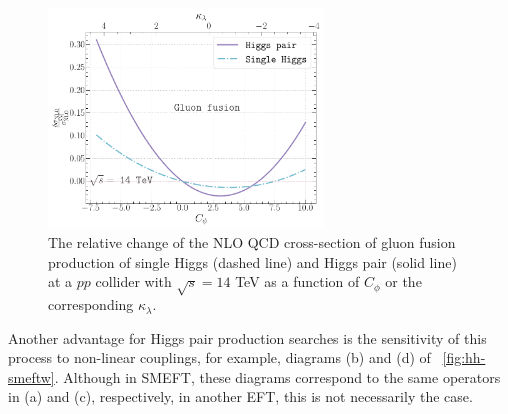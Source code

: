 \begin{figure}[h!]
	\begin{center}
		\includegraphics[width=0.65\textwidth]{figures/trilinear_single_vs_double}
		\caption{ The relative change of the NLO QCD cross-section of gluon fusion production of single Higgs (dashed line) and Higgs pair (solid line) at a $pp$ collider with $\sqrt{s}=14$ TeV as a function of $C_\phi$ or the corresponding $\kappa_\lambda$. \label{fig:hh-vs-h} }
	\end{center}
\end{figure}
Another advantage for Higgs pair production searches is the sensitivity of this process to non-linear couplings, for example, diagrams (b) and (d) of ~\autoref{fig:hh-smeftw}. Although in SMEFT, these diagrams correspond to the same operators in (a) and (c), respectively, in another EFT, this is not necessarily the case.
